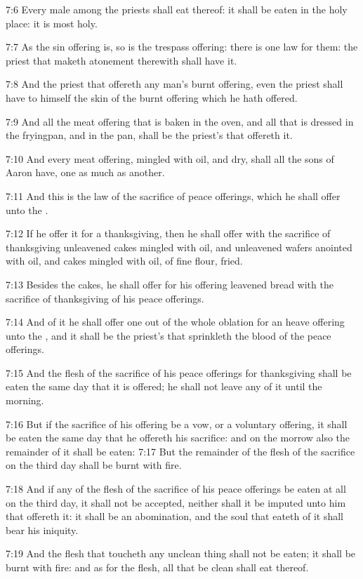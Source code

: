 7:6 Every male among the priests shall eat thereof: it shall be eaten in the holy place: it is most holy.

7:7 As the sin offering is, so is the trespass offering: there is one law for them: the priest that maketh atonement therewith shall have it.

7:8 And the priest that offereth any man's burnt offering, even the priest shall have to himself the skin of the burnt offering which he hath offered.

7:9 And all the meat offering that is baken in the oven, and all that is dressed in the fryingpan, and in the pan, shall be the priest's that offereth it.

7:10 And every meat offering, mingled with oil, and dry, shall all the sons of Aaron have, one as much as another.

7:11 And this is the law of the sacrifice of peace offerings, which he shall offer unto the \LORD.

7:12 If he offer it for a thanksgiving, then he shall offer with the sacrifice of thanksgiving unleavened cakes mingled with oil, and unleavened wafers anointed with oil, and cakes mingled with oil, of fine flour, fried.

7:13 Besides the cakes, he shall offer for his offering leavened bread with the sacrifice of thanksgiving of his peace offerings.

7:14 And of it he shall offer one out of the whole oblation for an heave offering unto the \LORD, and it shall be the priest's that sprinkleth the blood of the peace offerings.

7:15 And the flesh of the sacrifice of his peace offerings for thanksgiving shall be eaten the same day that it is offered; he shall not leave any of it until the morning.

7:16 But if the sacrifice of his offering be a vow, or a voluntary offering, it shall be eaten the same day that he offereth his sacrifice: and on the morrow also the remainder of it shall be eaten: 7:17 But the remainder of the flesh of the sacrifice on the third day shall be burnt with fire.

7:18 And if any of the flesh of the sacrifice of his peace offerings be eaten at all on the third day, it shall not be accepted, neither shall it be imputed unto him that offereth it: it shall be an abomination, and the soul that eateth of it shall bear his iniquity.

7:19 And the flesh that toucheth any unclean thing shall not be eaten; it shall be burnt with fire: and as for the flesh, all that be clean shall eat thereof.

